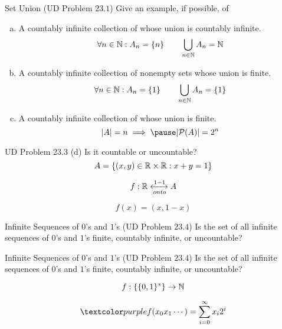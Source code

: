 
\begin{frame}{}
  \begin{exampleblock}{Set Union (UD Problem $23.1$)}
    Give an example, if possible, of
    \begin{enumerate}[(a)]
      \item A countably infinite collection of  whose union is countably infinite.
	\pause
	\[
	  \forall n \in \mathbb{N}: A_n = \{n\} \qquad \bigcup_{n \in \mathbb{N}} A_n = \mathbb{N}
	\]
	\pause
      \item A countably infinite collection of nonempty sets whose union is finite.
	\pause
	\[
	  \forall n \in \mathbb{N}: A_n = \{1\} \qquad \bigcup_{n \in \mathbb{N}} A_n = \{1\}
	\]
	\pause
      \item A countably infinite collection of  whose union is finite.
	\pause
	\[
	  |A| = n \implies \pause |\ps{A}| = 2^n
	\]
    \end{enumerate}
  \end{exampleblock}
\end{frame}

\begin{frame}{}
  \begin{exampleblock}{UD Problem 23.3 (d)}
    Is it countable or uncountable?
    \[
      A = \{(x, y) \in \mathbb{R} \times \mathbb{R}: x + y = 1\}
    \]
  \end{exampleblock}

  \pause
  \[
    f: \mathbb{R} \xleftrightarrow[onto]{1-1} A
  \]

  \pause
  \[
    f(x) = (x, 1-x)
  \]
\end{frame}

\begin{frame}{}
  \begin{exampleblock}{Infinite Sequences of $0$'s and $1$'s (UD Problem $23.4$)}
    Is the set of all infinite sequences of $0$'s and $1$'s finite,
    countably infinite, or uncountable?
  \end{exampleblock}

  \pause
  \begin{center}
  \end{center}
\end{frame}

\begin{frame}{}
  \begin{exampleblock}{Infinite Sequences of $0$'s and $1$'s (UD Problem $23.4$)}
    Is the set of all infinite sequences of $0$'s and $1$'s finite,
    countably infinite, or uncountable?
  \end{exampleblock}

  \[
    f: \{\{0,1\}^{\ast}\} \to \mathbb{N}
  \]

  \pause
  \[
    \purple{f(x_0 x_1 \cdots) = \sum_{i=0}^{\infty} x_i 2^{i}}
  \]

  \pause
\end{frame}

